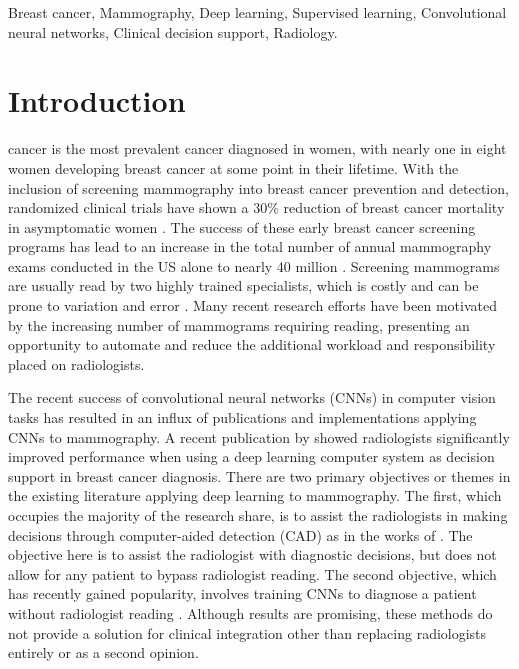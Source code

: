 \documentclass[journal]{IEEEtran}
\begin{document}
\begin{IEEEkeywords}
Breast cancer, Mammography, Deep learning, Supervised learning, Convolutional neural networks, Clinical decision support, Radiology.
\end{IEEEkeywords}


\IEEEpeerreviewmaketitle

\section{Introduction}
 cancer is the most prevalent cancer diagnosed in women, with nearly one in eight women developing breast cancer at some point in their lifetime.  
With the inclusion of screening mammography into breast cancer prevention and detection, randomized clinical trials have shown a 30\% reduction of breast cancer mortality in asymptomatic women \cite{duffy-2002}.  The success of these early breast cancer screening programs has lead to an increase in the total number of annual mammography exams conducted in the US alone to nearly 40 million \cite{broeders-2012}.  Screening mammograms are usually read by two highly trained specialists, which is costly and can be prone to variation and error \cite{kooi-2017}. Many recent research efforts \cite{ akselrod-2016,huynh-2016, qiu-2016,  samala-2016b,  abbas-2016, jiao-2016, shen-2017,becker-2016,kooi-2017,akselrod-2017,carneiro-2017,ribli-2017, mohamed-2018} have been motivated by the increasing number of mammograms requiring reading, presenting an opportunity to automate and reduce the additional workload and responsibility placed on radiologists.

The recent success of convolutional neural networks (CNNs) in computer vision tasks has resulted in an influx of publications and implementations applying CNNs to mammography.  A recent publication by \cite{karssemeijer-deeplearning} showed radiologists significantly improved performance when using a deep learning computer system as decision support in breast cancer diagnosis.  There are two primary objectives or themes in the existing literature applying deep learning to mammography.  The first, which occupies the majority of the research share, is to assist the radiologists in making decisions through computer-aided detection (CAD) as in the works of \cite{jamieson-2012, akselrod-2016,huynh-2016, kooi-2016, qiu-2016, samala-2016a, samala-2016b, dheeba-2014, abbas-2016, jiao-2016}.  The objective here is to assist the radiologist with diagnostic decisions, but does not allow for any patient to bypass radiologist reading.    The second objective, which has recently gained popularity, involves training CNNs to diagnose a patient without radiologist reading \cite{shen-2017,becker-2016,kooi-2017,akselrod-2017,carneiro-2017,ribli-2017, mohamed-2018}. Although results are promising, these methods do not provide a solution for clinical integration other than replacing radiologists entirely or as a second opinion. 
\end{document}

